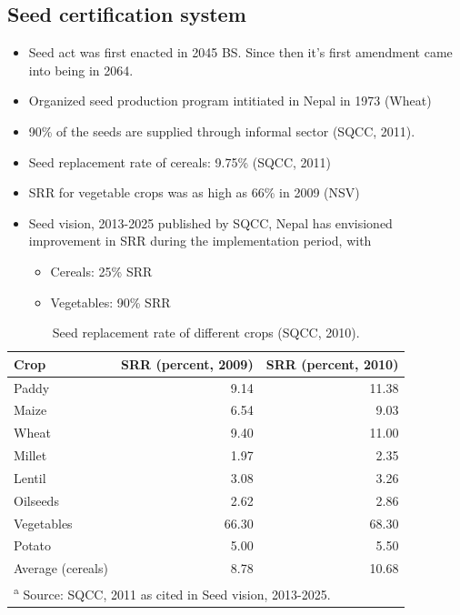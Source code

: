 \documentclass[
  openany]{book}
\providecommand{\tightlist}{%
  \setlength{\itemsep}{0pt}\setlength{\parskip}{0pt}}
\begin{document}
\hypertarget{seed-certification-system}{%
\subsection{Seed certification system}\label{seed-certification-system}}

\begin{itemize}
\tightlist
\item
  Seed act was first enacted in 2045 BS. Since then it's first amendment came into being in 2064.
\item
  Organized seed production program intitiated in Nepal in 1973 (Wheat)
\item
  90\% of the seeds are supplied through informal sector (SQCC, 2011).
\item
  Seed replacement rate of cereals: 9.75\% (SQCC, 2011)
\item
  SRR for vegetable crops was as high as 66\% in 2009 (NSV)
\item
  Seed vision, 2013-2025 published by SQCC, Nepal has envisioned improvement in SRR during the implementation period, with

  \begin{itemize}
  \tightlist
  \item
    Cereals: 25\% SRR
  \item
    Vegetables: 90\% SRR
  \end{itemize}
\end{itemize}

\begin{table}

\caption{\label{tab:seed-replacement-rate-crops}Seed replacement rate of different crops (SQCC, 2010).}
\centering
\begin{tabular}[t]{lrr}
\toprule
Crop & SRR (percent, 2009) & SRR (percent, 2010)\\
\midrule
\rowcolor{gray!6}  Paddy & 9.14 & 11.38\\
Maize & 6.54 & 9.03\\
\rowcolor{gray!6}  Wheat & 9.40 & 11.00\\
Millet & 1.97 & 2.35\\
\rowcolor{gray!6}  Lentil & 3.08 & 3.26\\
\addlinespace
Oilseeds & 2.62 & 2.86\\
\rowcolor{gray!6}  Vegetables & 66.30 & 68.30\\
Potato & 5.00 & 5.50\\
\rowcolor{gray!6}  Average (cereals) & 8.78 & 10.68\\
\bottomrule
\multicolumn{3}{l}{\textsuperscript{a} Source: SQCC, 2011 as cited in Seed vision, 2013-2025.}\\
\end{tabular}
\end{table}
\end{document}
